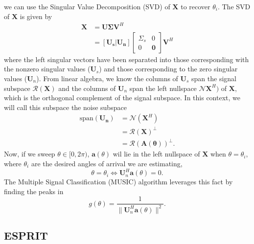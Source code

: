 we can use the Singular Value Decomposition (SVD) of $\bm{X}$ to recover
$\theta_i$. The SVD of $\bm{X}$ is given by
\begin{align}
	\bm{X} &= \bm{U} \bm{\Sigma} \bm{V}^H\\
	&= [\bm{U_s} | \bm{U_n}] \begin{bmatrix} \Sigma_s & 0 \\
	0 & \bm{0} \end{bmatrix} \bm{V}^H
\end{align}
where the left singular vectors have been separated into those corresponding
with the nonzero singular values ($\bm{U}_s$) and those corresponding to the
zero singular values ($\bm{U}_n$). From linear algebra, we know the columns of
$\bm{U}_s$ span the signal subspace $\mathcal{R}(\bm{X})$ and the columns of
$\bm{U}_n$ span the left nullspace $\mathcal{N}{\bm{X}^H})$ of $\bm{X}$, which
is the orthogonal complement of the signal subspace. In this context, we will
call this subspace the noise subspace
\begin{align}
	\text{span}(\bm{U_n}) &= \mathcal{N}(\bm{X}^H) \\
	&= \mathcal{R}(\bm{X})^\perp\\
	&= \mathcal{R}(\bm{A}(\bm{\theta}))^\perp.
\end{align}
Now, if we sweep $\theta \in [0, 2\pi)$, $\bm{a}(\theta)$ wil lie in the left
nullspace of $\bm{X}$ when $\theta=\theta_i$, where $\theta_i$ are the desired
angles of arrival we are estimating, 
\begin{equation}
	\theta = \theta_i \iff \bm{U}_n^H \bm{a}(\theta) = 0.
\end{equation}
The Multiple Signal Classification (MUSIC)
algorithm leverages this fact by finding the peaks in \cite{schmidt1986multiple}
\begin{equation}
	g(\theta) = \frac{1}{\|\bm{U}_n^H \bm{a}(\theta)\|^2}.
\end{equation}

\subsection{ESPRIT}
